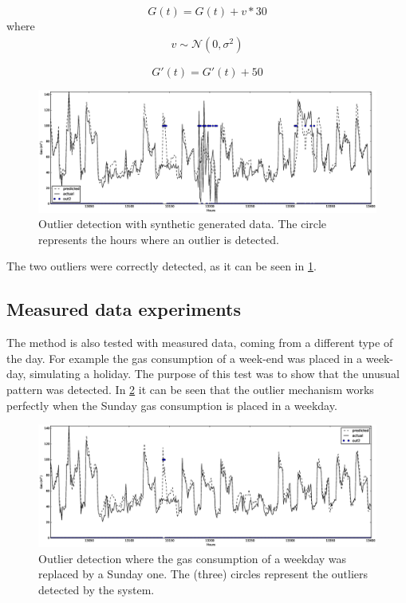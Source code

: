 \documentclass{sig-alternate-sigmod07}
\begin{document}
\begin{equation}G(t)= G(t)+v*30\label{equation:synt1} \end{equation}
where 
\begin{align*}v \sim \mathcal{N} (0,\sigma^2) \end{align*}

\begin{equation}G'(t)= G'(t)+50\label{equation:synt2} \end{equation}

\begin{figure}
\centering
\includegraphics[width=\textwidth]{images/outliersSynt.eps}
\caption{Outlier detection with synthetic generated data. The circle represents the hours where an outlier is detected.}
\label{fig:outlierSynt}
\end{figure}

The two outliers were correctly detected, as it can be seen in \cref{fig:outlierSynt}.

\subsection{Measured data experiments}
The method is also tested with measured data, coming from a different type of the day. For example the gas consumption of a week-end was placed in a week-day, simulating a holiday. The purpose of this test was to show that the unusual pattern was detected. In \cref{fig:outlierReal} it can be seen that the outlier mechanism works perfectly when the Sunday gas consumption is placed in a weekday. 

\begin{figure}
\centering
\includegraphics[width=\textwidth]{images/outliersReal.eps}
\caption{Outlier detection where the gas consumption of a weekday was replaced by a Sunday one. The (three) circles represent the outliers detected by the system.}
\label{fig:outlierReal}
\end{figure}
\end{document}
